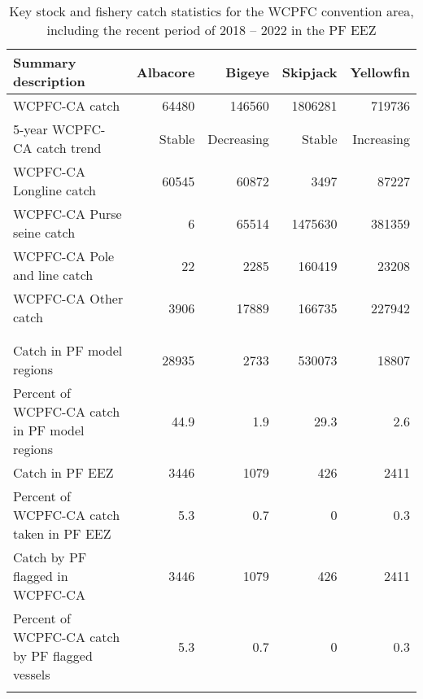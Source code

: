 \begin{longtable}{lrrrr}
\caption{Key stock and fishery catch statistics for the WCPFC convention area, including the recent period of 2018 -- 2022 in the PF EEZ} \\ 
  \hline
Summary description & Albacore & Bigeye & Skipjack & Yellowfin \\ 
  \hline
WCPFC-CA catch & 64480 & 146560 & 1806281 & 719736 \\ 
  5-year WCPFC-CA catch trend & Stable & Decreasing & Stable & Increasing \\ 
  WCPFC-CA Longline catch & 60545 & 60872 & 3497 & 87227 \\ 
  WCPFC-CA Purse seine catch & 6 & 65514 & 1475630 & 381359 \\ 
  WCPFC-CA Pole and line catch & 22 & 2285 & 160419 & 23208 \\ 
  WCPFC-CA Other catch & 3906 & 17889 & 166735 & 227942 \\ 
   &  &  &  &  \\ 
   \hline
 &  &  &  &  \\ 
  Catch in PF model regions & 28935 & 2733 & 530073 & 18807 \\ 
  Percent of WCPFC-CA catch in PF model regions & 44.9 & 1.9 & 29.3 & 2.6 \\ 
  Catch in PF EEZ & 3446 & 1079 & 426 & 2411 \\ 
  Percent of WCPFC-CA catch taken in PF EEZ & 5.3 & 0.7 & 0 & 0.3 \\ 
  Catch by PF flagged in WCPFC-CA & 3446 & 1079 & 426 & 2411 \\ 
  Percent of WCPFC-CA catch by PF flagged vessels & 5.3 & 0.7 & 0 & 0.3 \\ 
  \hline
\label{cat_sum_tab}
\end{longtable}

